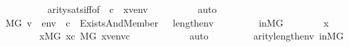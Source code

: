 \begin{isabellebody}
\ \ \ \ \ \ \ \ \isamarkupfalse%
\ arity{\isacharunderscore}{\kern0pt}sats{\isacharunderscore}{\kern0pt}iff{\isacharbrackleft}{\kern0pt}of\ {\isasymphi}\ {\isachardoublequoteopen}{\isacharbrackleft}{\kern0pt}c{\isacharbrackright}{\kern0pt}{\isachardoublequoteclose}\ {\isacharunderscore}{\kern0pt}\ {\isachardoublequoteopen}{\isacharbrackleft}{\kern0pt}x{\isacharcomma}{\kern0pt}v{\isacharbrackright}{\kern0pt}{\isacharat}{\kern0pt}env{\isachardoublequoteclose}{\isacharbrackright}{\kern0pt}\isanewline
\ \ \ \ \ \ \ \ \isamarkupfalse%
\ auto\isanewline
\ \ \ \ \isamarkupfalse%
\isanewline
\ \ \ \ \ \ \isamarkupfalse%
\ {\isachardoublequoteopen}M{\isacharbrackleft}{\kern0pt}G{\isacharbrackright}{\kern0pt}{\isacharcomma}{\kern0pt}\ {\isacharbrackleft}{\kern0pt}v{\isacharbrackright}{\kern0pt}\ {\isacharat}{\kern0pt}\ env\ {\isacharat}{\kern0pt}\ {\isacharbrackleft}{\kern0pt}c{\isacharbrackright}{\kern0pt}\ {\isasymTurnstile}\ Exists{\isacharparenleft}{\kern0pt}And{\isacharparenleft}{\kern0pt}Member{\isacharparenleft}{\kern0pt}{}{\isacharcomma}{\kern0pt}\ {}\ {\isacharhash}{\kern0pt}{\isacharplus}{\kern0pt}\ length{\isacharparenleft}{\kern0pt}env{\isacharparenright}{\kern0pt}{\isacharparenright}{\kern0pt}{\isacharcomma}{\kern0pt}\ {\isasymphi}{\isacharparenright}{\kern0pt}{\isacharparenright}{\kern0pt}{\isachardoublequoteclose}\isanewline
\ \ \ \ \ \ \isamarkupfalse%
\ inMG\isanewline
\ \ \ \ \ \ \isamarkupfalse%
\ x\ \isanewline
\ \ \ \ \ \ \ \ {\isachardoublequoteopen}x{\isasymin}M{\isacharbrackleft}{\kern0pt}G{\isacharbrackright}{\kern0pt}{\isachardoublequoteclose}\ {\isachardoublequoteopen}x{\isasymin}c{\isachardoublequoteclose}\ {\isachardoublequoteopen}M{\isacharbrackleft}{\kern0pt}G{\isacharbrackright}{\kern0pt}{\isacharcomma}{\kern0pt}\ {\isacharbrackleft}{\kern0pt}x{\isacharcomma}{\kern0pt}v{\isacharbrackright}{\kern0pt}{\isacharat}{\kern0pt}env{\isacharat}{\kern0pt}{\isacharbrackleft}{\kern0pt}c{\isacharbrackright}{\kern0pt}\ {\isasymTurnstile}\ {\isasymphi}{\isachardoublequoteclose}\isanewline
\ \ \ \ \ \ \ \ \isamarkupfalse%
\ auto\isanewline
\ \ \ \ \ \ \isamarkupfalse%
\ {\isacartoucheopen}{\isasymphi}{\isasymin}{\isacharunderscore}{\kern0pt}{\isacartoucheclose}\ {\isacartoucheopen}arity{\isacharparenleft}{\kern0pt}{\isasymphi}{\isacharparenright}{\kern0pt}{\isasymle}{}{\isacharhash}{\kern0pt}{\isacharplus}{\kern0pt}length{\isacharparenleft}{\kern0pt}env{\isacharparenright}{\kern0pt}{\isacartoucheclose}\ inMG\isanewline

\end{isabellebody}

